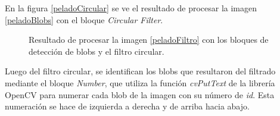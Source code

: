 En la figura \ref{peladoCircular} se ve el resultado de procesar la imagen \ref{peladoBlobs} con el bloque \emph{Circular Filter}.

\begin{figure}[H]
        \centering
        \hspace{3 mm}
  \caption{Resultado de procesar la imagen \ref{peladoFiltro} con los bloques de detección de blobs y el filtro circular.}
      \label{ejemplocircularfilter}
\end{figure}

Luego del filtro circular, se identifican los blobs que resultaron del filtrado mediante el bloque \emph{Number}, que utiliza la función \emph{cvPutText} de la librería  OpenCV\cite{opencv} para numerar cada blob de la imagen con su número de \textit{id}. Esta numeración se hace de izquierda a derecha y de arriba hacia abajo.


